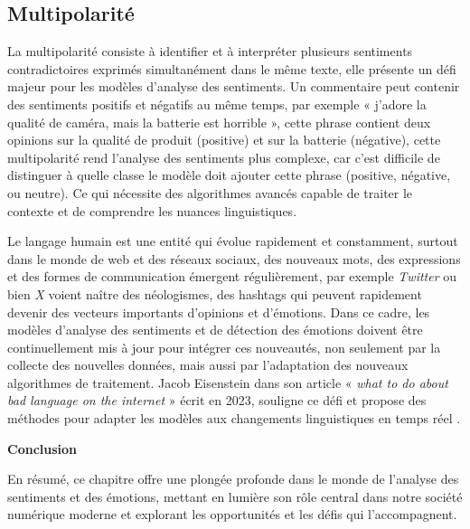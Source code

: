  \subsection{Multipolarité}
 La multipolarité consiste à identifier et à interpréter plusieurs sentiments contradictoires exprimés simultanément dans le même texte, elle présente un défi majeur pour les modèles d’analyse des sentiments. Un commentaire peut contenir des sentiments positifs et négatifs au même temps, par exemple « j’adore la qualité de caméra, mais la batterie est horrible », cette phrase contient deux opinions sur la qualité de produit (positive) et sur la batterie (négative), cette multipolarité rend l’analyse des sentiments plus complexe, car c’est difficile de distinguer à quelle classe le modèle doit ajouter cette phrase (positive, négative, ou neutre).
Ce qui nécessite des algorithmes avancés capable de traiter le contexte et de comprendre les nuances linguistiques.


Le langage humain est une entité qui évolue rapidement et constamment, surtout dans le monde de web et des réseaux sociaux, des nouveaux mots, des expressions et des formes de communication émergent régulièrement, par exemple \textit{Twitter} ou bien \textit{X} voient naître des néologismes, des hashtags qui peuvent rapidement devenir des vecteurs importants d’opinions et d’émotions. Dans ce cadre, les modèles d’analyse des sentiments et de détection des émotions doivent être continuellement mis à jour pour intégrer ces nouveautés, non seulement par la collecte des nouvelles données, mais aussi par l’adaptation des nouveaux algorithmes de traitement. Jacob Eisenstein dans son article «\textit{ what to do about bad language on the internet} » écrit en 2023, souligne ce défi et propose des méthodes pour adapter les modèles aux changements linguistiques en temps réel \cite{eisenstein2013bad}.

\textbf{Conclusion}\par
En résumé, ce chapitre offre une plongée profonde dans le monde de l'analyse des sentiments et des émotions, mettant en lumière son rôle central dans notre société numérique moderne et explorant les opportunités et les défis qui l'accompagnent.






